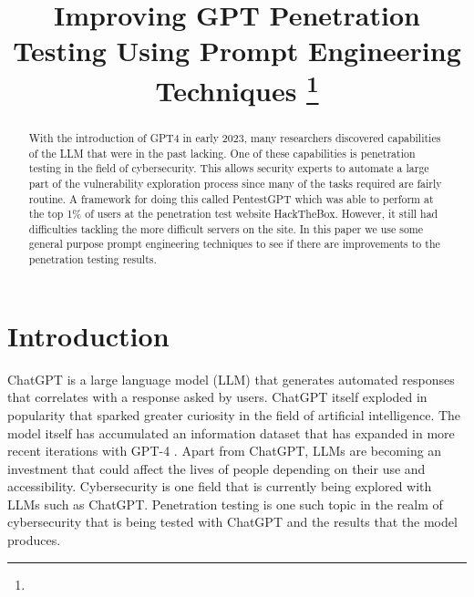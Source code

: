 \documentclass[conference]{IEEEtran}
\begin{document}
\title{Improving GPT Penetration Testing Using Prompt Engineering Techniques
\thanks{}
}
\author{
\and
{}
\and
{}
}

\maketitle

\begin{abstract}
    With the introduction of GPT4 in early 2023, many researchers discovered capabilities of the LLM that were in the past lacking. One of these capabilities is penetration testing in the field of cybersecurity. This allows security experts to automate a large part of the vulnerability exploration process since many of the tasks required are fairly routine. A framework for doing this called PentestGPT which was able to perform at the top 1\% of users at the penetration test website HackTheBox. However, it still had difficulties tackling the more difficult servers on the site. In this paper we use some general purpose prompt engineering techniques to see if there are improvements to the penetration testing results.
\end{abstract}

\section{Introduction} \label{sec:intro}
ChatGPT is a large language model (LLM) that generates automated responses that correlates with a response asked by users\cite{engman2023evaluation}. ChatGPT itself exploded in popularity that sparked greater curiosity in the field of artificial intelligence. The model itself has accumulated an information dataset that has expanded in more recent iterations with GPT-4 \cite{hariri2023unlocking}. Apart from ChatGPT, LLMs are becoming an investment that could affect the lives of people depending on their use and accessibility. Cybersecurity is one field that is currently being explored with LLMs such as ChatGPT. Penetration testing is one such topic in the realm of cybersecurity that is being tested with ChatGPT and the results that the model produces.
\end{document}
